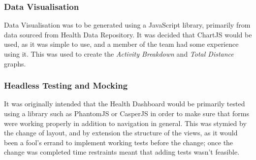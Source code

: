 \subsubsection{Data Visualisation}
\par
Data Visualisation was to be generated using a JavaScript library, primarily from data sourced from Health Data Repository. It was decided that ChartJS\cite{chartjs} would be used, as it was simple to use, and a member of the team had some experience using it. This was used to create the \textit{Activity Breakdown} and \textit{Total Distance} graphs.

\subsubsection{Headless Testing and Mocking}
\par
It was originally intended that the Health Dashboard would be primarily tested using a library such as PhantomJS or CasperJS in order to make sure that forms were working properly in addition to navigation in general. This was stymied by the change of layout, and by extension the structure of the views, as it would been a fool's errand to implement working tests before the change; once the change was completed time restraints meant that adding tests wasn't feasible.
